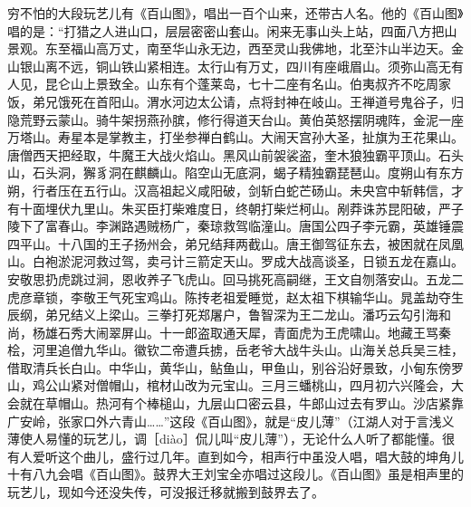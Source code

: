 \documentclass[12pt,UTF8]{ctexbook}
\begin{document}
穷不怕的大段玩艺儿有《百山图》，唱出一百个山来，还带古人名。他的《百山图》唱的是：“打猎之人进山口，层层密密山套山。闲来无事山头上站，四面八方把山景观。东至福山高万丈，南至华山永无边，西至灵山我佛地，北至汴山半边天。金山银山离不远，铜山铁山紧相连。太行山有万丈，四川有座峨眉山。须弥山高无有人见，昆仑山上景致全。山东有个蓬莱岛，七十二座有名山。伯夷叔齐不吃周家饭，弟兄饿死在首阳山。渭水河边太公请，点将封神在岐山。王禅道号鬼谷子，归隐荒野云蒙山。骑牛架拐燕孙膑，修行得道天台山。黄伯英怒摆阴魂阵，金泥一座万塔山。寿星本是掌教主，打坐参禅白鹤山。大闹天宫孙大圣，扯旗为王花果山。唐僧西天把经取，牛魔王大战火焰山。黑风山前袈裟盗，奎木狼独霸平顶山。石头山，石头洞，獬豸洞在麒麟山。陷空山无底洞，蝎子精独霸琵琶山。度朔山有东方朔，行者压在五行山。汉高祖起义咸阳破，剑斩白蛇芒砀山。未央宫中斩韩信，才有十面埋伏九里山。朱买臣打柴难度日，终朝打柴烂柯山。剐莽诛苏昆阳破，严子陵下了富春山。李渊路遇贼杨广，秦琼救驾临潼山。唐国公四子李元霸，英雄锤震四平山。十八国的王子扬州会，弟兄结拜两截山。唐王御驾征东去，被困就在凤凰山。白袍淤泥河救过驾，卖弓计三箭定天山。罗成大战高谈圣，日锁五龙在嘉山。安敬思扔虎跳过涧，恩收养子飞虎山。回马挑死高嗣继，王文自刎落安山。五龙二虎彦章锁，李敬王气死宝鸡山。陈抟老祖爱睡觉，赵太祖下棋输华山。晁盖劫夺生辰纲，弟兄结义上梁山。三拳打死郑屠户，鲁智深为王二龙山。潘巧云勾引海和尚，杨雄石秀大闹翠屏山。十一郎盗取通天犀，青面虎为王虎啸山。地藏王骂秦桧，河里追僧九华山。徽钦二帝遭兵掳，岳老爷大战牛头山。山海关总兵吴三桂，借取清兵长白山。中华山，黄华山，鲇鱼山，甲鱼山，别谷沿好景致，小甸东傍罗山，鸡公山紧对僧帽山，棺材山改为元宝山。三月三蟠桃山，四月初六兴隆会，大会就在草帽山。热河有个棒槌山，九层山口密云县，牛郎山过去有罗山。沙店紧靠广安岭，张家口外六青山……”这段《百山图》，就是“皮儿薄”（江湖人对于言浅义薄使人易懂的玩艺儿，调［diào］侃儿叫“皮儿薄”），无论什么人听了都能懂。很有人爱听这个曲儿，盛行过几年。直到如今，相声行中虽没人唱，唱大鼓的坤角儿十有八九会唱《百山图》。鼓界大王刘宝全亦唱过这段儿。《百山图》虽是相声里的玩艺儿，现如今还没失传，可没报迁移就搬到鼓界去了。
\end{document}
